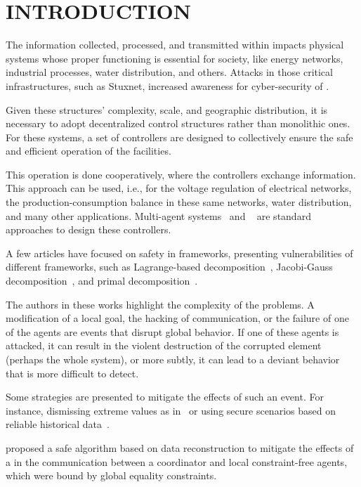 \documentclass{ifacconf}  %
\begin{document}
\section{INTRODUCTION}
The information collected, processed, and transmitted within \cps{} impacts physical systems whose proper functioning is essential for society, like energy networks, industrial processes, water distribution, and others.
Attacks in those critical infrastructures, such as Stuxnet, increased awareness for cyber-security of \cps{}.

Given these structures' complexity, scale, and geographic distribution, it is necessary to adopt decentralized control structures rather than monolithic ones.
For these systems, a set of controllers are designed to collectively ensure the safe and efficient operation of the facilities.

This operation is done cooperatively, where the controllers exchange information.
This approach can be used, i.e., for the voltage regulation of electrical networks, the production-consumption balance in these same networks, water distribution, and many other applications.
Multi-agent systems~\citep{KantamneniEtAl2015} and \dmpc{}~\citep{MaestreEtAl2014} are standard approaches to design these controllers.

A few articles have focused on safety in \dmpc{} frameworks, presenting vulnerabilities of different frameworks, such as Lagrange-based decomposition~\citep{VelardeEtAl2017}, Jacobi-Gauss decomposition~\citep{ChanfreutEtAl2018}, and primal decomposition~\citep{NogueiraEtAl2021}.

The authors in these works highlight the complexity of the problems. A modification of a local goal, the hacking of communication, or the failure of one of the agents are events that disrupt global behavior.
If one of these agents is attacked, it can result in the violent destruction of the corrupted element (perhaps the whole system), or more subtly, it can lead to a deviant behavior that is more difficult to detect.

Some strategies are presented to mitigate the effects of such an event.
For instance, dismissing extreme values as in~\cite{VelardeEtAl2017} or
using secure scenarios based on reliable historical data~\cite{MaestreEtAl2021}.

\cite{NogueiraEtAl2021} proposed a safe algorithm based on data reconstruction to mitigate the effects of a \fdi{} in the communication between a coordinator and local constraint-free agents, which were bound by global equality constraints.
\end{document}
